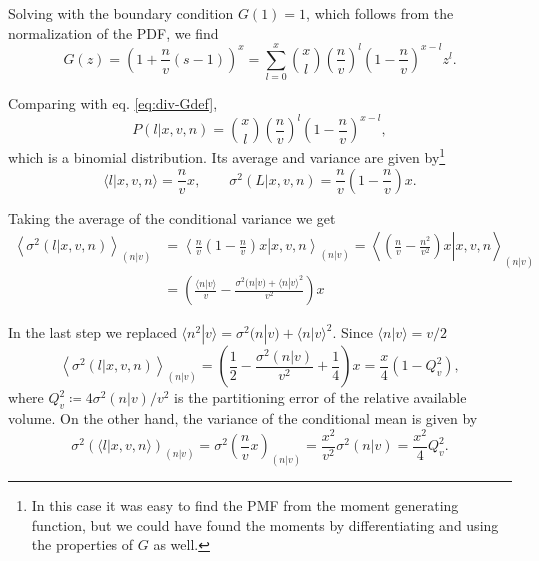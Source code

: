 Solving with the boundary condition $G(1) = 1$, which follows from the normalization of the PDF, we find
\begin{equation*}
  G(z) = \left(1+\frac{n}{v}\left(s-1\right)\right)^x = \sum_{l=0}^x {x\choose l}\left(\frac{n}{v}\right)^l\left(1-\frac{n}{v}\right)^{x-l}z^l.
\end{equation*}

Comparing with eq. \eqref{eq:div-Gdef},
\begin{equation*}
  P(l|x,v,n) = {x\choose l}\left(\frac{n}{v}\right)^l\left(1-\frac{n}{v}\right)^{x-l},
\end{equation*}
which is a binomial distribution. Its average and variance are given by\footnote{In this case it was easy to find the PMF from the moment generating function, but we could have found the moments by differentiating and using the properties of $G$ as well.}
\begin{equation*}
  \langle l|x,v,n\rangle = \frac{n}{v}x, \quad\quad \sigma^2(L|x,v,n) = \frac{n}{v}\left(1-\frac{n}{v}\right)x.
\end{equation*}

Taking the average of the conditional variance we get
\begin{equation*}
  \begin{split}
    \left\langle\sigma^2(l|x,v,n)\right\rangle_{(n|v)} &= \left\langle\left.\frac{n}{v}\left(1-\frac{n}{v}\right)x\right|x,v,n\right\rangle_{(n|v)} = \left\langle\left.\left(\frac{n}{v}-\frac{n^2}{v^2}\right)x\right|x,v,n\right\rangle_{(n|v)}\\
    &= \left(\frac{\langle n|v\rangle}{v}-\frac{\sigma^2(n|v) + \langle n|v\rangle^2}{v^2}\right)x
  \end{split}
\end{equation*}

In the last step we replaced $\langle n^2|v\rangle = \sigma^2(n|v) + \langle n|v\rangle^2$. Since $\langle n|v\rangle = v/2$
\begin{equation}
  \label{eq:div-varofavel}
  \left\langle\sigma^2(l|x,v,n)\right\rangle_{(n|v)} = \left(\frac{1}{2} - \frac{\sigma^2(n|v)}{v^2} + \frac{1}{4}\right)x = \frac{x}{4}\left(1-Q_v^2\right),
\end{equation}
where $Q_v^2 \coloneqq 4\sigma^2(n|v)/v^2$ is the partitioning error of the relative available volume. On the other hand, the variance of the conditional mean is given by
\begin{equation}
  \label{eq:div-aveofvarl}
  \sigma^2\left(\langle l|x,v,n\rangle\right)_{(n|v)} = \sigma^2\left(\frac{n}{v}x\right)_{(n|v)} = \frac{x^2}{v^2}\sigma^2(n|v) = \frac{x^2}{4}Q_v^2.
\end{equation}

